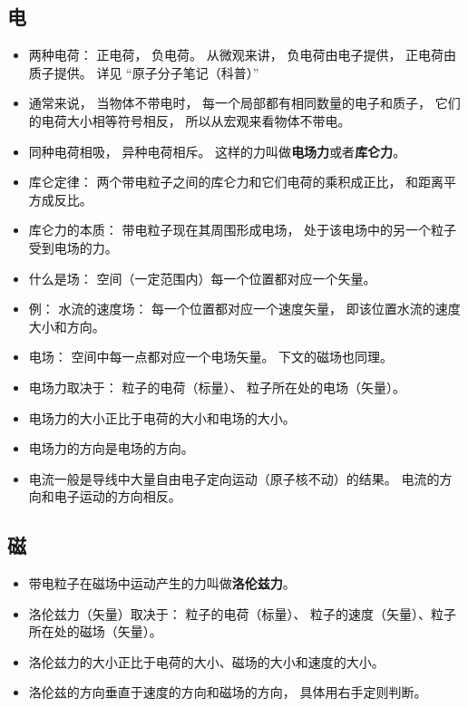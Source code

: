 
\begin{issues}
\issueDraft
\end{issues}

\subsection{电}
\begin{itemize}
\item 两种电荷： 正电荷， 负电荷。 从微观来讲， 负电荷由电子提供， 正电荷由质子提供。 详见 “原子分子笔记（科普）”
\item 通常来说， 当物体不带电时， 每一个局部都有相同数量的电子和质子， 它们的电荷大小相等符号相反， 所以从宏观来看物体不带电。
\item 同种电荷相吸， 异种电荷相斥。 这样的力叫做\textbf{电场力}或者\textbf{库仑力}。
\item 库仑定律： 两个带电粒子之间的库仑力和它们电荷的乘积成正比， 和距离平方成反比。
\item 库仑力的本质： 带电粒子现在其周围形成电场， 处于该电场中的另一个粒子受到电场的力。
\item 什么是场： 空间（一定范围内）每一个位置都对应一个矢量。
\item 例： 水流的速度场： 每一个位置都对应一个速度矢量， 即该位置水流的速度大小和方向。
\item 电场： 空间中每一点都对应一个电场矢量。 下文的磁场也同理。
\item 电场力取决于：  粒子的电荷（标量）、 粒子所在处的电场（矢量）。
\item 电场力的大小正比于电荷的大小和电场的大小。
\item 电场力的方向是电场的方向。
\item 电流一般是导线中大量自由电子定向运动（原子核不动）的结果。 电流的方向和电子运动的方向相反。
\end{itemize}

\subsection{磁}
\begin{itemize}
\item 带电粒子在磁场中运动产生的力叫做\textbf{洛伦兹力}。
\item 洛伦兹力（矢量）取决于： 粒子的电荷（标量）、 粒子的速度（矢量）、粒子所在处的磁场（矢量）。
\item 洛伦兹力的大小正比于电荷的大小、磁场的大小和速度的大小。
\item 洛伦兹的方向垂直于速度的方向和磁场的方向， 具体用右手定则判断。
\end{itemize}
